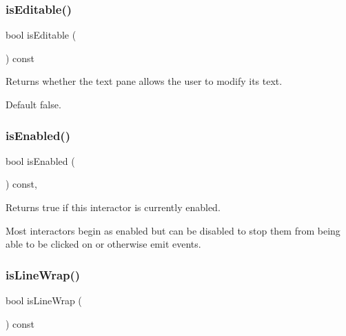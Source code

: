 \subsubsection{\texorpdfstring{is\+Editable()}{isEditable()}}
{\footnotesize\ttfamily bool is\+Editable (\begin{DoxyParamCaption}{ }\end{DoxyParamCaption}) const\hspace{0.3cm}{\ttfamily [virtual]}}



Returns whether the text pane allows the user to modify its text. 

Default false. \mbox{\label{classGInteractor_aacb819fb241851fd9fc045271baa4034}} 
\subsubsection{\texorpdfstring{is\+Enabled()}{isEnabled()}}
{\footnotesize\ttfamily bool is\+Enabled (\begin{DoxyParamCaption}{ }\end{DoxyParamCaption}) const\hspace{0.3cm}{\ttfamily [virtual]}, {\ttfamily [inherited]}}



Returns true if this interactor is currently enabled. 

Most interactors begin as enabled but can be disabled to stop them from being able to be clicked on or otherwise emit events. \mbox{\label{classGBrowserPane_ae09e72290b6e8a23bcc77752da6dffa5}} 
\subsubsection{\texorpdfstring{is\+Line\+Wrap()}{isLineWrap()}}
{\footnotesize\ttfamily bool is\+Line\+Wrap (\begin{DoxyParamCaption}{ }\end{DoxyParamCaption}) const\hspace{0.3cm}{\ttfamily [virtual]}}



